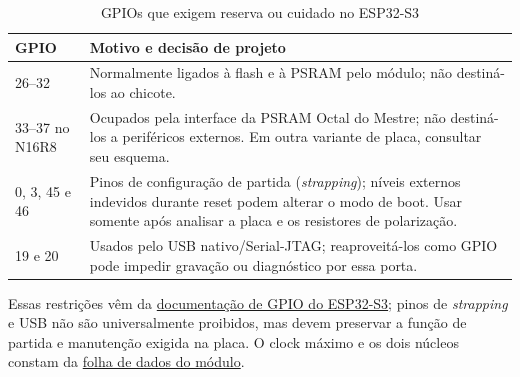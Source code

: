 \begin{table}[htbp]\centering\small
\caption{GPIOs que exigem reserva ou cuidado no ESP32-S3}\label{tab:pinos-especiais}
\begin{tabularx}{\textwidth}{@{}p{2.6cm}X@{}}\toprule
GPIO & Motivo e decisão de projeto\\\midrule
26--32 & Normalmente ligados à flash e à PSRAM pelo módulo; não destiná-los ao chicote.\\
33--37 no N16R8 & Ocupados pela interface da PSRAM Octal do Mestre; não destiná-los a periféricos externos. Em outra variante de placa, consultar seu esquema.\\
0, 3, 45 e 46 & Pinos de configuração de partida (\emph{strapping}); níveis externos indevidos durante reset podem alterar o modo de boot. Usar somente após analisar a placa e os resistores de polarização.\\
19 e 20 & Usados pelo USB nativo/Serial-JTAG; reaproveitá-los como GPIO pode impedir gravação ou diagnóstico por essa porta.\\\bottomrule
\end{tabularx}\end{table}

Essas restrições vêm da \href{https://docs.espressif.com/projects/esp-idf/en/stable/esp32s3/api-reference/peripherals/gpio.html}{documentação de GPIO do ESP32-S3}; pinos de \emph{strapping} e USB não são universalmente proibidos, mas devem preservar a função de partida e manutenção exigida na placa. O clock máximo e os dois núcleos constam da \href{https://www.espressif.com/sites/default/files/documentation/esp32-s3-wroom-1_wroom-1u_datasheet_en.pdf}{folha de dados do módulo}.

